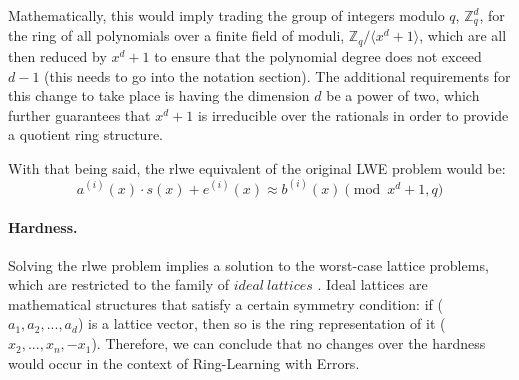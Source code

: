 \documentclass[11pt,
  titlepage=false,
  abstract=on,
]{scrreprt}
\begin{document}
Mathematically, this would imply trading the group of integers modulo $q$, $\mathbb{Z}^d_q$, for the ring of all polynomials over a finite field of moduli, $\mathbb{Z}_q / \langle x^d + 1\rangle$, which are all then reduced by $x^d + 1$
to ensure that the polynomial degree does not exceed $d-1$ (this needs to go into the notation section).
The additional requirements for this change  to take place is having the dimension $d$ be a power of two, which further guarantees that $x^d + 1$ is irreducible over the rationals in order to provide
a quotient ring structure.

With that being said, the \gls{rlwe} equivalent of the original LWE problem would be:
\begin{equation*}
  a^{(i)}(x) \cdot s(x) + e^{(i)}(x) \approx b^{(i)}(x) \pmod{x^d + 1, q}
  \label{The Ring-Learning with Errors Problem}
\end{equation*}


\paragraph{Hardness.} Solving the \gls{rlwe} problem implies a solution to the worst-case lattice problems, which are restricted to the family of $ideal\ lattices$ \cite{lyubashevsky2010ideal}. Ideal lattices are mathematical
structures that satisfy a certain symmetry condition: if ($a_1, a_2,..., a_d$) is a lattice vector, then so is the ring representation of it ($x_2,...,x_n, -x_1$).
Therefore, we can conclude that no changes over the hardness would occur in the context of Ring-Learning with Errors.
\end{document}
